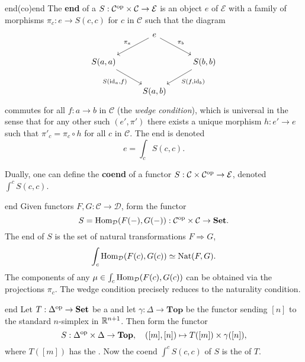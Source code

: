 \begin{topic}{end}{(co)end}
    The \textbf{end} of a  $S : \mathcal{C}^\textup{op} \times \mathcal{C} \to \mathcal{E}$ is an object $e$ of $\mathcal{E}$ with a family of morphisms $\pi_c : e \to S(c, c)$ for $c$ in $\mathcal{C}$ such that the diagram
    \[ \begin{tikzcd} & e \arrow[swap]{ld}{\pi_a} \arrow{dr}{\pi_b} & \\ S(a, a) \arrow[swap]{dr}{S(\id_a, f)} && S(b, b) \arrow{ld}{S(f, \id_b)} \\ & S(a, b) & \end{tikzcd} \]
    commutes for all $f : a \to b$ in $\mathcal{C}$ (the \textit{wedge condition}), which is universal in the sense that for any other such $(e', \pi')$ there exists a unique morphism $h : e' \to e$ such that $\pi'_c = \pi_c \circ h$ for all $c$ in $\mathcal{C}$. The end is denoted
    \[ e = \int_c S(c, c) . \]
    
    Dually, one can define the \textbf{coend} of a functor $S : \mathcal{C} \times \mathcal{C}^\textup{op} \to \mathcal{E}$, denoted $\int^c S(c, c)$.
\end{topic}

\begin{example}{end}
    Given functors $F, G : \mathcal{C} \to \mathcal{D}$, form the functor
    \[ S = \text{Hom}_\mathcal{D}(F(-), G(-)) : \mathcal{C}^\textup{op} \times \mathcal{C} \to \textbf{Set} . \]
    The end of $S$ is the set of natural transformations $F \Rightarrow G$,
    \[ \int_c \text{Hom}_\mathcal{D}(F(c), G(c)) \simeq \textup{Nat}(F, G) . \]
    The components of any $\mu \in \int_c \text{Hom}_\mathcal{D}(F(c), G(c))$ can be obtained via the projections $\pi_c$. The wedge condition precisely reduces to the naturality condition.
\end{example}

\begin{example}{end}
    Let $T : \Delta^\textup{op} \to \textbf{Set}$ be a  and let $\gamma : \Delta \to \textbf{Top}$ be the functor sending $[n]$ to the standard $n$-simplex in $\mathbb{R}^{n + 1}$. Then form the functor
    \[ S : \Delta^\textup{op} \times \Delta \to \textbf{Top}, \quad ([m], [n]) \mapsto T([m]) \times \gamma([n]) , \]
    where $T([m])$ has the . Now the coend $\int^c S(c, c)$ of $S$ is the  of $T$.
\end{example}
